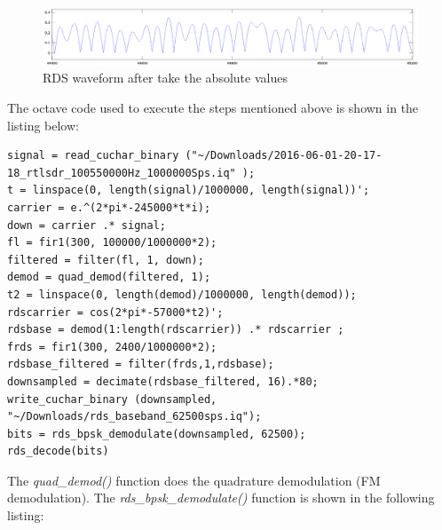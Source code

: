 \begin{figure}
	\centering
	\includegraphics[width=1\linewidth]{gfx/rds/rds_magnitude_waveform.png}
	\caption{RDS waveform after take the absolute values}
	\label{fig:rds_waveform}
\end{figure}

The octave code used to execute the steps mentioned above is shown in the
listing below:

\begin{lstlisting}[label=lst:octave_rds, caption=Octave implementation of the RDS demodulator, language=none]
signal = read_cuchar_binary ("~/Downloads/2016-06-01-20-17-18_rtlsdr_100550000Hz_1000000Sps.iq" );
t = linspace(0, length(signal)/1000000, length(signal))';
carrier = e.^(2*pi*-245000*t*i);
down = carrier .* signal;
fl = fir1(300, 100000/1000000*2);
filtered = filter(fl, 1, down);
demod = quad_demod(filtered, 1);
t2 = linspace(0, length(demod)/1000000, length(demod));
rdscarrier = cos(2*pi*-57000*t2)';
rdsbase = demod(1:length(rdscarrier)) .* rdscarrier ;
frds = fir1(300, 2400/1000000*2);
rdsbase_filtered = filter(frds,1,rdsbase);
downsampled = decimate(rdsbase_filtered, 16).*80;
write_cuchar_binary (downsampled, "~/Downloads/rds_baseband_62500sps.iq");
bits = rds_bpsk_demodulate(downsampled, 62500);
rds_decode(bits)
\end{lstlisting}

The \emph{quad\_demod()} function does the quadrature demodulation
(FM demodulation). The \emph{rds\_bpsk\_demodulate()} function is shown
in the following listing:

